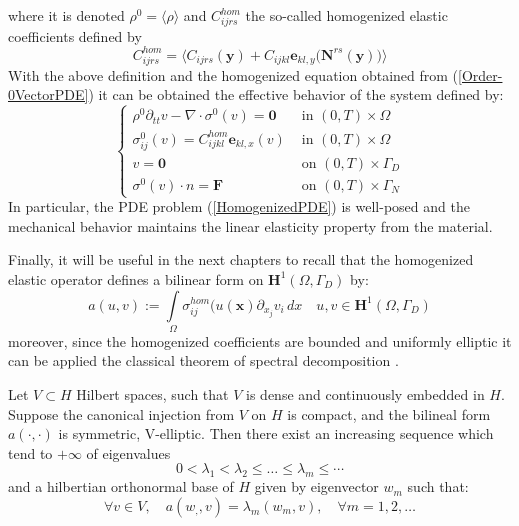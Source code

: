 where it is denoted $\rho^{0} = \langle \rho \rangle$ and $C_{ijrs}^{hom}$ the so-called homogenized elastic coefficients defined by 
\begin{equation*}
    C_{ijrs}^{hom} = \big \langle C_{ijrs}(\mathbf{y}) + C_{ijkl}\mathbf{e}_{kl,y}\big(\mathbf{N}^{rs}(\mathbf{y})\big) \big \rangle 
\end{equation*}
With the above definition and the homogenized equation obtained from (\ref{Order-0VectorPDE}) it can be obtained the effective behavior of the system defined by:
\begin{equation}
    \label{HomogenizedPDE}
    \left \{
    \begin{array}{cc}
        \rho^{0} \partial_{tt} v - \nabla \cdot \sigma^{0} (v) = \mathbf{0} & \text{ in } (0,T) \times \Omega \\
        \sigma^{0}_{ij}(v) = C^{hom}_{ijkl}\mathbf{e}_{kl,x}(v) & \text{ in } (0,T)\times\Omega \\
        v = \mathbf{0} & \text{ on } (0,T)\times\Gamma_D \\
        \sigma^{0}(v) \cdot n = \mathbf{F} & \text{ on }(0,T)\times \Gamma_N
    \end{array}
    \right .
\end{equation}
In particular, the PDE problem (\ref{HomogenizedPDE}) is well-posed and the mechanical behavior maintains the linear elasticity property from the material.

Finally, it will be useful in the next chapters to recall that the homogenized elastic operator defines a bilinear form on $\mathbf{H}^1(\Omega, \Gamma_D)$ by:
\begin{equation*}
    a(u,v) := \int \limits_{\Omega} \sigma^{hom}_{ij}(u(\mathbf{x}) \partial_{x_j} v_i \, dx \quad u,v \in \mathbf{H}^1(\Omega, \Gamma_D)
\end{equation*}
moreover, since the homogenized coefficients are bounded and uniformly elliptic it can be applied the classical theorem of spectral decomposition \cite{raviart1983introduction}.
\begin{prop}
\label{EigenValuesProp}
Let $V \subset H$ Hilbert spaces, such that $V$ is dense and continuously embedded in $H$. Suppose the canonical injection from $V$ on $H$ is compact, and the bilineal form $a(\cdot, \cdot)$ is symmetric, V-elliptic. Then there exist an increasing sequence which tend to $+ \infty$ of eigenvalues
\begin{equation*}
    0 < \lambda_1 < \lambda_2  \leq \dots \leq \lambda_m \leq \cdots 
\end{equation*}
and a hilbertian orthonormal base of $H$ given by eigenvector $w_m$ such that:
\begin{equation*}
    \forall v \in V, \quad a(w_,, v) = \lambda_m (w_m, v), \quad \forall m = 1, 2, \dots
\end{equation*}
\end{prop}




